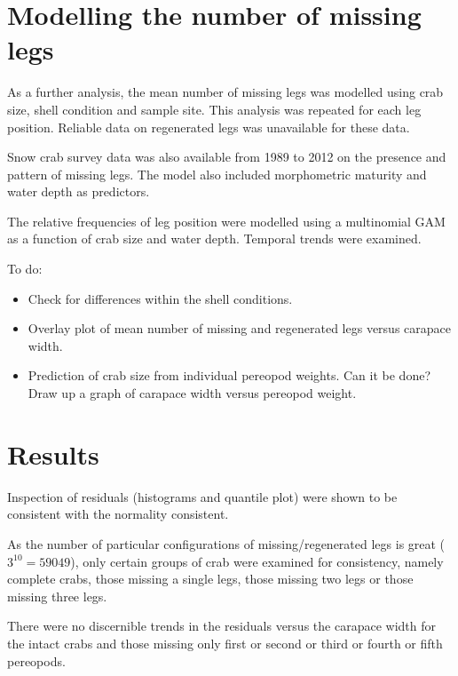 \documentclass[letterpaper, 10pt]{article}
\begin{document}
\section{Modelling the number of missing legs}

As a further analysis, the mean number of missing legs was modelled using crab size, shell condition and sample site. This analysis was repeated for each leg position. Reliable data on regenerated legs was unavailable for these data. 

Snow crab survey data was also available from 1989 to 2012 on the presence and pattern of missing legs. 
The model also included morphometric maturity and water depth as predictors.

The relative frequencies of leg position were modelled using a multinomial GAM as a function of crab size and water depth. 
Temporal trends were examined. 


To do:
\begin{itemize}
   \item Check for differences within the shell conditions.
   \item Overlay plot of mean number of missing and regenerated legs versus carapace width.
   \item Prediction of crab size from individual pereopod weights. Can it be done? Draw up a graph of 
         carapace width versus pereopod weight.
\end{itemize}

\section{Results}

Inspection of residuals (histograms and quantile plot) were shown to be consistent with the normality consistent.

As the number of particular configurations of missing/regenerated legs is great ($3^{10} = 59049$), only certain groups of crab were examined for consistency, namely complete crabs, those missing a single legs, those missing two legs or those missing three legs.

There were no discernible trends in the residuals versus the carapace width for the intact crabs and those missing only first or second or third or fourth or fifth pereopods.
\end{document}
